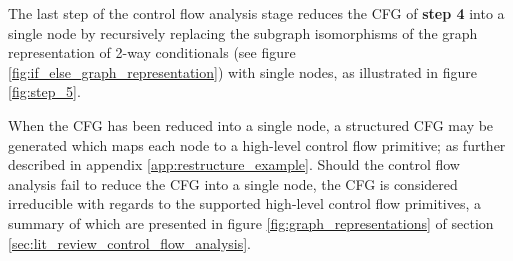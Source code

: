 The last step of the control flow analysis stage reduces the CFG of \textbf{step 4} into a single node by recursively replacing the subgraph isomorphisms of the graph representation of 2-way conditionals (see figure \ref{fig:if_else_graph_representation}) with single nodes, as illustrated in figure \ref{fig:step_5}.

When the CFG has been reduced into a single node, a structured CFG may be generated which maps each node to a high-level control flow primitive; as further described in appendix \ref{app:restructure_example}. Should the control flow analysis fail to reduce the CFG into a single node, the CFG is considered irreducible with regards to the supported high-level control flow primitives, a summary of which are presented in figure \ref{fig:graph_representations} of section \ref{sec:lit_review_control_flow_analysis}.

